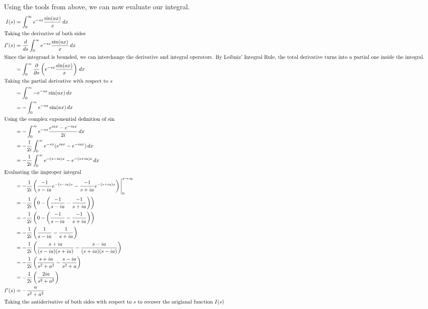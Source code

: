 \documentclass[12pt]{article}
\theoremstyle{definition}
\begin{document}
Using the tools from above, we can now evaluate our integral.
\begin{align*}
    I(s) &= \int_{0}^{\infty} e^{-sx} \frac{\sin(ax)}{x} \,dx \\
    \intertext{Taking the derivative of both sides}
    I'(s) &= \frac{d}{ds} \int_{0}^{\infty} e^{-sx} \frac{\sin(ax)}{x} \,dx \\
    \intertext{Since the integrand is bounded, we can interchange the derivative and integral operators. By Leibniz' Integral Rule, the total derivative turns into a partial one inside the integral.}
    &= \int_{0}^{\infty} \frac{\partial}{\partial s} \left(e^{-sx} \frac{\sin(ax)}{x}\right) \,dx \\
    \intertext{Taking the partial derivative with respect to $s$}
    &= \int_{0}^{\infty} -e^{-sx} \sin(ax) \,dx \\
    &= -\int_{0}^{\infty} e^{-sx} \sin(ax) \,dx \\
    \intertext{Using the complex exponential definition of $\sin$}
    &= -\int_{0}^{\infty} e^{-sx} \frac{e^{iax} - e^{-iax}}{2i} \,dx \\
    &= - \frac{1}{2i} \int_{0}^{\infty} e^{-sx}(e^{iax} - e^{-iax})\,dx \\
    &= - \frac{1}{2i} \int_{0}^{\infty} e^{-(s - ia)x} - e^{-(s + ia)x}\,dx \\
    \intertext{Evaluating the improper integral}
    &= - \frac{1}{2i} \left(\frac{-1}{s - ia} e^{-(s - ia)x} - \frac{-1}{s + ia}  e^{-(s + ia)x}\right)\Bigg|_{0}^{x \to \infty} \\
    &= - \frac{1}{2i} \left(0 - \left(\frac{-1}{s - ia} - \frac{-1}{s + ia}\right)\right) \\
    &= - \frac{1}{2i} \left(0 - \left(\frac{-1}{s - ia} - \frac{-1}{s + ia}\right)\right) \\
    &= - \frac{1}{2i} \left(\frac{1}{s -ia} - \frac{1}{s + ia}\right) \\
    &= - \frac{1}{2i} \left(\frac{s + ia}{(s - ia)(s + ia)} - \frac{s - ia}{(s + ia)(s - ia)}\right) \\
    &= - \frac{1}{2i} \left(\frac{s + ia}{s^2 + a^2} - \frac{s - ia}{s^2 + a}\right) \\
    &= - \frac{1}{2i} \left(\frac{2ia}{s^2 + a^2}\right) \\
    I'(s) &= - \frac{a}{s^2 + a^2} \\
    \intertext{Taking the antiderivative of both sides with respect to $s$ to recover the origianal function $I(s)$} 

\end{align*}
\end{document}
